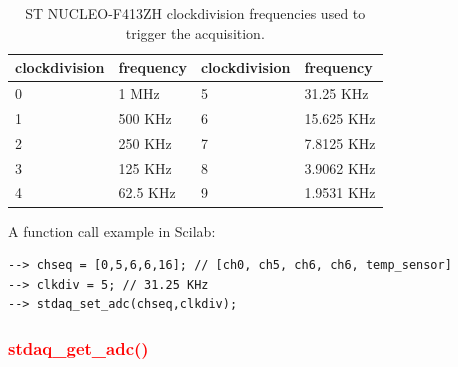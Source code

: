 \documentclass[letterpaper,10pt,english]{hitec}
\begin{document}
\begin{table}[h]
\caption{ST NUCLEO-F413ZH clockdivision frequencies used to trigger the acquisition.}
\centering
\begin{tabular}{|ll|ll|}
 clockdivision & frequency & clockdivision & frequency \\ \hline
 0 & 1 MHz & 5 & 31.25 KHz \\
 1 & 500 KHz & 6 & 15.625 KHz \\
 2 & 250 KHz & 7 & 7.8125 KHz \\
 3 & 125 KHz & 8 & 3.9062 KHz \\
 4 & 62.5 KHz & 9 & 1.9531 KHz \\
\end{tabular}
\end{table}
A function call example in Scilab:
\begin{verbatim}
--> chseq = [0,5,6,6,16]; // [ch0, ch5, ch6, ch6, temp_sensor]
--> clkdiv = 5; // 31.25 KHz
--> stdaq_set_adc(chseq,clkdiv);
\end{verbatim}


\subsubsection{\textcolor{red}{stdaq\_get\_adc()}}
\end{document}
